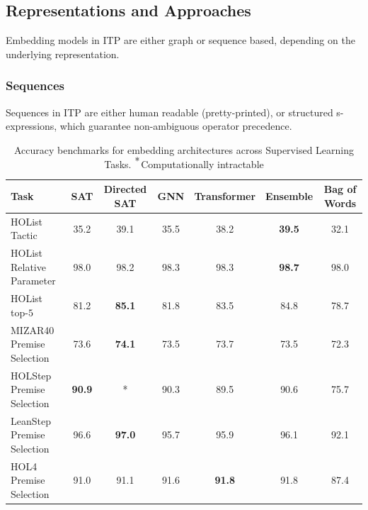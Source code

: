 \documentclass[letterpaper]{article} %
\newcommand\system[1]{#1}
\newcommand\dataset[1]{#1}
\begin{document}
    \subsection{Representations and Approaches}
    Embedding models in ITP are either graph or sequence based, depending on the underlying representation.

    \subsubsection{Sequences}
    Sequences in ITP are either human readable (pretty-printed), or structured s-expressions, which guarantee non-ambiguous operator precedence.

    \begin{table}[ht]
        \centering
        \begin{tabular}[t]{lcccccc}
            \toprule

            Task                                 & SAT           & Directed SAT  & GNN  & Transformer   & Ensemble      & Bag of Words \\
            \midrule
            \dataset{HOList} Tactic              & 35.2          & 39.1          & 35.5 & 38.2          & \textbf{39.5} & 32.1         \\
            \dataset{HOList} Relative Parameter  & 98.0          & 98.2          & 98.3 & 98.3          & \textbf{98.7} & 98.0         \\
            \dataset{HOList} top-$5$             & 81.2          & \textbf{85.1} & 81.8 & 83.5          & 84.8          & 78.7         \\
            \dataset{MIZAR40} Premise Selection  & 73.6          & \textbf{74.1} & 73.5 & 73.7          & 73.5          & 72.3         \\
            \dataset{HOLStep} Premise Selection  & \textbf{90.9} & *             & 90.3 & 89.5          & 90.6          & 75.7         \\
            \dataset{LeanStep} Premise Selection & 96.6          & \textbf{97.0} & 95.7 & 95.9          & 96.1          & 92.1         \\
            \system{HOL4} Premise Selection      & 91.0          & 91.1          & 91.6 & \textbf{91.8} & 91.8          & 87.4         \\
            \bottomrule
        \end{tabular}
        \caption{Accuracy benchmarks for embedding architectures across Supervised Learning Tasks. $\sp{\mbox{*}}$Computationally intractable}
        \label{fig:results}
    \end{table}%
\end{document}
